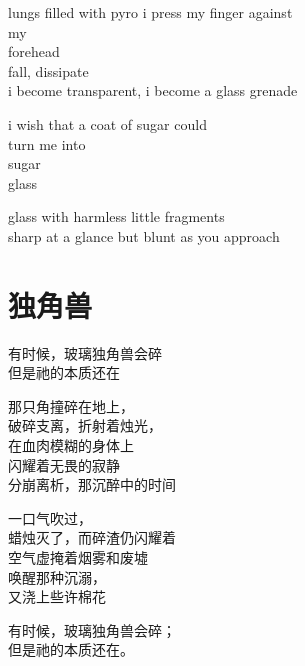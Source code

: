 \documentclass[parskip=full,12pt,oneside,a5paper]{scrbook}
\begin{document}
lungs filled with pyro i press my finger against\\
my\\
forehead\\
fall, dissipate\\
i become transparent, i become a glass grenade

i wish that a coat of sugar could\\
turn me into\\
sugar\\
glass

glass with harmless little fragments\\
sharp at a glance but blunt as you approach

\chapter{独角兽}
\begingroup\addtolength{\baselineskip}{0.75ex}

有时候，玻璃独角兽会碎\\
但是祂的本质还在

那只角撞碎在地上，\\
破碎支离，折射着烛光，\\
在血肉模糊的身体上\\
闪耀着无畏的寂静\\
分崩离析，那沉醉中的时间

一口气吹过，\\
蜡烛灭了，而碎渣仍闪耀着\\
空气虚掩着烟雾和废墟\\
唤醒那种沉溺，\\
又浇上些许棉花

有时候，玻璃独角兽会碎；\\
但是祂的本质还在。

\endgroup
\end{document}
